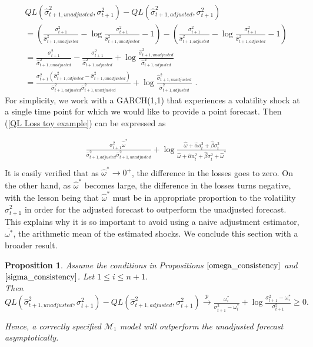 \documentclass[11pt,3p,review,authoryear]{elsarticle}
\def\mc#1{\mathcal{#1}} %
\def\mc#1{\mathcal{#1}}
\newtheorem{prop}{Proposition}
\theoremstyle{definition}
\begin{document}
\begin{align}
  & QL(\hat\sigma_{t+1, unadjusted}^{2},\sigma^{2}_{t+1})-QL(\hat\sigma^{2}_{t+1, adjusted},\sigma^{2}_{t+1})\\
   & =(\frac{\sigma_{t+1}^{2}}{\hat\sigma^{2}_{t+1,unadjusted}} - \log{\frac{\sigma_{t+1}^{2}}{\hat\sigma^{2}_{t+1,unadjusted}} } - 1) - (\frac{\sigma_{t+1}^{2}}{\hat\sigma^{2}_{t+1,adjusted}} - \log{\frac{\sigma_{t+1}^{2}}{\hat\sigma^{2}_{t+1,adjusted}}} - 1)\\
   & = \frac{\sigma_{t+1}^{2}}{\hat\sigma^{2}_{t+1,unadjusted}} - \frac{\sigma_{t+1}^{2}}{\hat\sigma^{2}_{t+1,adjusted}}+ \log{\frac{\hat\sigma^{2}_{t+1,unadjusted}}{\hat\sigma^{2}_{t+1,adjusted}}}\\
   & = \frac{\sigma_{t+1}^{2}(\hat\sigma^{2}_{t+1,adjusted}-\hat\sigma^{2}_{t+1,unadjusted})}{\hat\sigma^{2}_{t+1,adjusted}\hat\sigma^{2}_{t+1,unadjusted}} + \log{\frac{\hat\sigma^{2}_{t+1,unadjusted}}{\hat\sigma^{2}_{t+1,adjusted}}}\label{QL Loss toy example} \text{ .}
\end{align}
For simplicity, we work with a GARCH(1,1) that experiences a volatility shock at a single time point for which we would like to provide a point forecast.  Then (\ref{QL Loss toy example}) can be expressed as

\begin{align*}
   &\frac{\sigma^{2}_{t+1}\hat\omega^{*}}{\hat\sigma^{2}_{t+1,adjusted}\hat\sigma^{2}_{t+1,unadjusted}} + \log{\frac{\hat\omega + \hat\alpha a_{t}^{2} + \hat\beta\sigma_{t}^{2}}{\hat\omega + \hat\alpha a_{t}^{2} + \hat\beta\sigma_{t}^{2} + \hat\omega^{*}}}\\
\end{align*}\label{QL Loss Consistency - GARCH(1,1)}
It is easily verified that as $\hat\omega^{*} \rightarrow 0^{+}$, the difference in the losses goes to zero.  On the other hand, as $\hat\omega^{*}$ becomes large, the difference in the losses turns negative, with the lesson being that $\hat\omega^{*}$ must be in appropriate proportion to the volatility $\sigma^{2}_{t+1}$ in order for the adjusted forecast to outperform the unadjusted forecast.  This explains why it is so important to avoid using a naive adjustment estimator, $\overline{\omega^{*}}$, the arithmetic mean of the estimated shocks.  We conclude this section with a broader result. 

\begin{prop}\label{asymptotic_consistency}
Assume the conditions in Propositions $\ref{omega_consistency}$ and $\ref{sigma_consistency}$.  Let $1\leq i\leq n+1$.\\
  Then $QL(\hat\sigma_{t+1, unadjusted}^{2},\sigma^{2}_{t+1})-QL(\hat\sigma^{2}_{t+1, adjusted},\sigma^{2}_{t+1})\xrightarrow{p} \frac{\omega_{i}^{*}}{\sigma^{2}_{t+1}-\omega_{i}^{*}} + \log{\frac{\sigma_{t+1}^{2}-\omega_{i}^{*}}{\sigma_{t+1}^{2}} } \geq 0. $

Hence, a correctly specified $\mc{M}_1$ model will outperform the unadjusted forecast asymptotically.
\end{prop}
\end{document}
